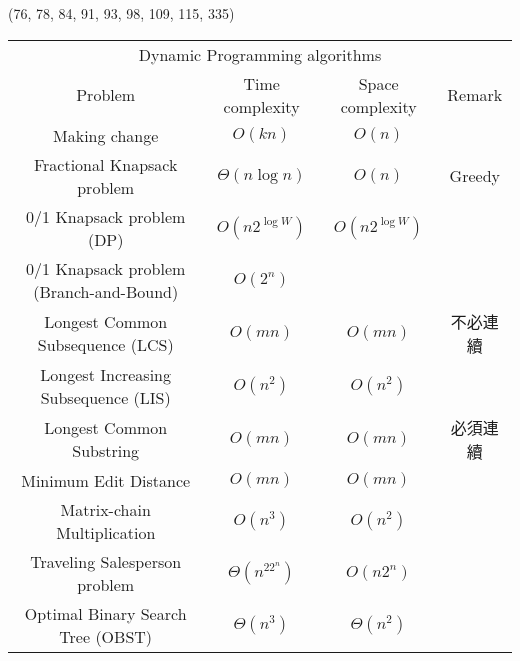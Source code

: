 \item \begin{theorem}{(76, 78, 84, 91, 93, 98, 109, 115, 335)} \quad\quad
    \begin{table}[H]
        \centering
        \begin{tabular}{|c|c|c|c|}
            \hline
            \multicolumn{4}{|c|}{Dynamic Programming algorithms} \\
            \Xhline{3\arrayrulewidth}
            Problem & Time complexity & Space complexity & Remark \\
            \Xhline{2\arrayrulewidth}
            Making change & $O(kn)$ & $O(n)$ & \\
            \hline
            Fractional Knapsack problem & $\Theta(n\log n)$ & $O(n)$ & Greedy \\
            \hline
            0/1 Knapsack problem (DP) & $O(n2^{\log W})$ & $O(n2^{\log W})$ & \\
            \hline
            0/1 Knapsack problem (Branch-and-Bound) & $O(2^n)$ & & \\
            \hline
            Longest Common Subsequence (LCS) & $O(mn)$ & $O(mn)$ & 不必連續 \\
            \hline
            Longest Increasing Subsequence (LIS) & $O(n^2)$ & $O(n^2)$ & \\
            \hline
            Longest Common Substring & $O(mn)$ & $O(mn)$ & 必須連續 \\
            \hline
            Minimum Edit Distance & $O(mn)$ & $O(mn)$ & \\
            \hline
            Matrix-chain Multiplication & $O(n^3)$ & $O(n^2)$ & \\
            \hline
            Traveling Salesperson problem & $\Theta(n^22^n)$ & $O(n2^n)$ & \\
            \hline
            Optimal Binary Search Tree (OBST) & $\Theta(n^3)$ & $\Theta(n^2)$ & \\
            \hline
        \end{tabular}
    \end{table}
\end{theorem}
